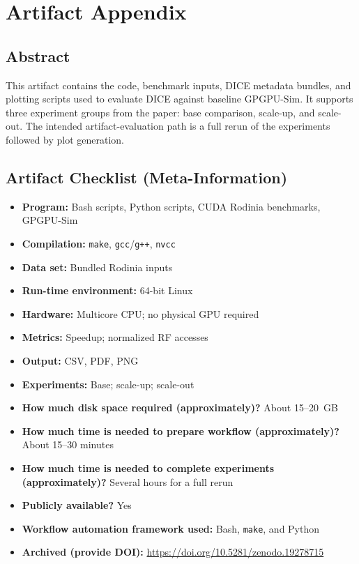 \appendix
\section{Artifact Appendix}

\subsection{Abstract}
This artifact contains the code, benchmark inputs, DICE metadata bundles, and plotting scripts used to evaluate DICE against baseline GPGPU-Sim. It supports three experiment groups from the paper: base comparison, scale-up, and scale-out. The intended artifact-evaluation path is a full rerun of the experiments followed by plot generation.

\subsection{Artifact Checklist (Meta-Information)}

{\small
\begin{itemize}
  \item \textbf{Program:} Bash scripts, Python scripts, CUDA Rodinia benchmarks, GPGPU-Sim
  \item \textbf{Compilation:} \texttt{make}, \texttt{gcc}/\texttt{g++}, \texttt{nvcc}
  \item \textbf{Data set:} Bundled Rodinia inputs
  \item \textbf{Run-time environment:} 64-bit Linux
  \item \textbf{Hardware:} Multicore CPU; no physical GPU required
  \item \textbf{Metrics:} Speedup; normalized RF accesses
  \item \textbf{Output:} CSV, PDF, PNG
  \item \textbf{Experiments:} Base; scale-up; scale-out
  \item \textbf{How much disk space required (approximately)?} About 15--20~GB
  \item \textbf{How much time is needed to prepare workflow (approximately)?} About 15--30 minutes
  \item \textbf{How much time is needed to complete experiments (approximately)?} Several hours for a full rerun
  \item \textbf{Publicly available?} Yes
  \item \textbf{Workflow automation framework used:} Bash, \texttt{make}, and Python
  \item \textbf{Archived (provide DOI):} \url{https://doi.org/10.5281/zenodo.19278715}
\end{itemize}
}

